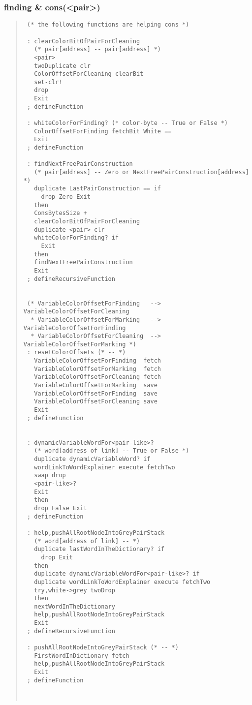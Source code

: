 \documentclass[a4paper]{article}
\begin{document}
\subsubsection{finding \& cons(\textless{}pair\textgreater{})}

\begin{quote}
\begin{verbatim}
 (* the following functions are helping cons *)

 : clearColorBitOfPairForCleaning
   (* pair[address] -- pair[address] *)
   <pair>
   twoDuplicate clr
   ColorOffsetForCleaning clearBit
   set-clr!
   drop
   Exit
 ; defineFunction

 : whiteColorForFinding? (* color-byte -- True or False *)
   ColorOffsetForFinding fetchBit White ==
   Exit
 ; defineFunction

 : findNextFreePairConstruction
   (* pair[address] -- Zero or NextFreePairConstruction[address] *)
   duplicate LastPairConstruction == if
     drop Zero Exit
   then
   ConsBytesSize +
   clearColorBitOfPairForCleaning
   duplicate <pair> clr
   whiteColorForFinding? if
     Exit
   then
   findNextFreePairConstruction
   Exit
 ; defineRecursiveFunction


 (* VariableColorOffsetForFinding   -->  VariableColorOffsetForCleaning
  * VariableColorOffsetForMarking   -->  VariableColorOffsetForFinding
  * VariableColorOffsetForCleaning  -->  VariableColorOffsetForMarking *)
 : resetColorOffsets (* -- *)
   VariableColorOffsetForFinding  fetch
   VariableColorOffsetForMarking  fetch
   VariableColorOffsetForCleaning fetch
   VariableColorOffsetForMarking  save
   VariableColorOffsetForFinding  save
   VariableColorOffsetForCleaning save
   Exit
 ; defineFunction


 : dynamicVariableWordFor<pair-like>?
   (* word[address of link] -- True or False *)
   duplicate dynamicVariableWord? if
   wordLinkToWordExplainer execute fetchTwo
   swap drop
   <pair-like>?
   Exit
   then
   drop False Exit
 ; defineFunction

 : help,pushAllRootNodeIntoGreyPairStack
   (* word[address of link] -- *)
   duplicate lastWordInTheDictionary? if
     drop Exit
   then
   duplicate dynamicVariableWordFor<pair-like>? if
   duplicate wordLinkToWordExplainer execute fetchTwo
   try,white->grey twoDrop
   then
   nextWordInTheDictionary
   help,pushAllRootNodeIntoGreyPairStack
   Exit
 ; defineRecursiveFunction

 : pushAllRootNodeIntoGreyPairStack (* -- *)
   FirstWordInDictionary fetch
   help,pushAllRootNodeIntoGreyPairStack
   Exit
 ; defineFunction



\end{verbatim}
\end{quote}
\end{document}
